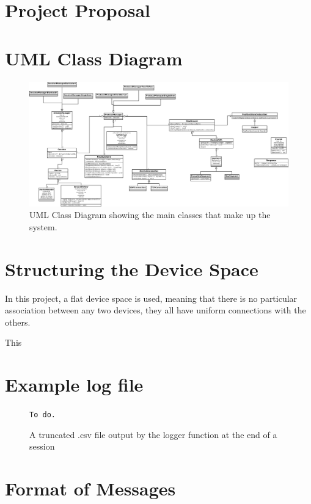 %
\cleardoublepage

\appendix

\chapter{Project Proposal}

%

\chapter{UML Class Diagram}

\begin{figure}
\centering
\includegraphics[angle = 90, scale=0.17]{UMLClassDiagram}
\caption{UML Class Diagram showing the main classes that make up the system.}
\label{fig:uml}
\end{figure}

\chapter{Structuring the Device Space}
\label{deviceStructure}

In this project, a flat device space is used, meaning that there is no particular association between any two devices, they all have uniform connections with the others.

This 

\chapter{Example log file}

\begin{figure}
{\tt To do.}
\caption{A truncated .csv file output by the logger function at the end of a session}
\label{csv}
\end{figure}

\chapter{Format of Messages}
\label{messageFormats}


